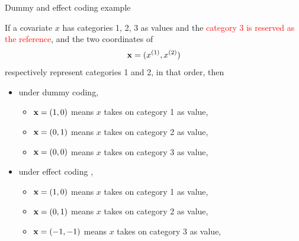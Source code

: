 \documentclass{beamer}
\begin{document}
\begin{frame} {Dummy and effect coding example}

If a covariate $x$ has categories 1, 2, 3 as values and the \textcolor{red}{category 3 is reserved as the reference}, and the two coordinates of 
\[
{\bf x} = (x^{(1)}, x^{(2)})
\]
 respectively represent categories 1 and 2, in that order, then
 
 \begin{itemize}
 \item under dummy coding,
\begin{itemize}

\item ${\bf x} = (1, 0)$ means $x$ takes on category 1 as value, 
\item ${\bf x} = (0, 1)$ means $x$ takes on category 2 as value, 
\item ${\bf x} = (0, 0)$ means $x$ takes on category 3 as value, 
\end{itemize}

\item under effect coding ,

\begin{itemize}

\item ${\bf x} = (1, 0)$ means $x$ takes on category 1 as value, 
\item ${\bf x} = (0, 1)$ means $x$ takes on category 2 as value, 
\item ${\bf x} = (-1, -1)$ means $x$ takes on category 3 as value, 
\end{itemize}
\end{itemize}

\end{frame}
\end{document}
